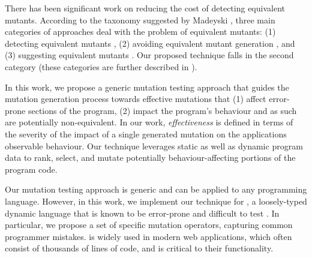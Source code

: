 There has been significant work on reducing the cost of detecting equivalent mutants.
According to the taxonomy suggested by Madeyski \etal \cite{madeyski:tse13}, three main categories of approaches
deal with the problem of equivalent mutants: (1) detecting equivalent mutants \cite{offutt:tvr97, offutt:compass96}, (2) avoiding equivalent mutant generation \cite{adamopoulos:gecco04}, and (3) suggesting equivalent
mutants \cite{schuler:tvr12}. Our proposed technique falls in the second category (these categories are further described in ).

In this work, we propose a generic mutation testing approach that guides the mutation generation process towards effective mutations that (1)  affect error-prone sections of the program, (2)  impact the program's behaviour and as such are potentially non-equivalent. In our work, \emph{effectiveness} is defined in terms of the severity of the impact of a single generated mutation on the applications observable behaviour.  %
Our technique leverages static as well as dynamic program data to rank, select, and mutate potentially behaviour-affecting portions of the program code. %

Our mutation testing approach is generic and can be applied to any programming language. However, in this work, we implement our technique for \javascript, a loosely-typed dynamic language that is known to be error-prone \cite{Crockford:2008, Ocariza-2011} and difficult to test \cite{mesbah:tse12, artzi:icse11}. In particular, we propose a set of \javascript specific mutation operators, capturing  common  \javascript programmer mistakes. \javascript is widely used in modern web applications, which often consist of thousands of lines of \javascript code, and is critical to their functionality. %

